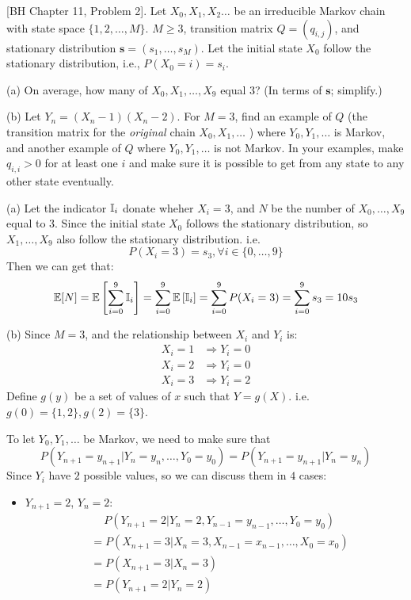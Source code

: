 \begin{homeworkProblem}

[BH Chapter 11, Problem 2]. Let $X_0, X_1, X_2 \ldots$ be an irreducible Markov chain with state space $\{1,2, \ldots, M\}$. $M \geq 3$, transition matrix $Q=\left(q_{i,j}\right)$, and stationary distribution $\mathbf{s}=\left(s_1, \ldots, s_M\right)$. Let the initial state $X_0$ follow the stationary distribution, i.e., $P\left(X_0=i\right)=s_i$.

(a) On average, how many of $X_0, X_1, \ldots, X_9$ equal 3? (In terms of $\mathbf{s}$; simplify.)

(b) Let $Y_n=\left(X_n-1\right)\left(X_n-2\right)$. For $M=3$, find an example of $Q$ (the transition matrix for the \textit{original} chain $X_0, X_1, \ldots$ ) where $Y_0, Y_1, \ldots$ is Markov, and another example of $Q$ where $Y_0, Y_1, \ldots$ is not Markov. In your examples, make $q_{i,i}>0$ for at least one $i$ and make sure it is possible to get from any state to any other state eventually.

\solution

(a) Let the indicator $\mathbb{I}_i$ donate wheher $X_i=3$, and $N$ be the number of $X_0,\ldots,X_9$ equal to 3. Since the initial state $X_0$ follows the stationary distribution, so $X_1,\ldots,X_9$ also follow the stationary distribution. i.e.
$$P(X_i=3)=s_3, \forall i\in\{0,\ldots,9\}$$
Then we can get that:
$$\mathbb{E}[N] = \mathbb{E}\left[\sum_{i=0}^9 \mathbb{I}_i\right] = \sum_{i=0}^9 \mathbb{E}\left[\mathbb{I}_i\right] = \sum_{i=0}^9 P(X_i=3) = \sum_{i=0}^9 s_3 = 10s_3$$

(b) Since $M=3$, and the relationship between $X_i$ and $Y_i$ is:
\begin{align*}
X_i=1 &\Rightarrow Y_i=0 \\
X_i=2 &\Rightarrow Y_i=0 \\
X_i=3 &\Rightarrow Y_i=2
\end{align*}
Define $g(y)$ be a set of values of $x$ such that $Y=g(X)$. i.e. $g(0)=\{1,2\}, g(2)=\{3\}$.

To let $Y_0,Y_1,\ldots$ be Markov, we need to make sure that
$$P(Y_{n+1}=y_{n+1}|Y_n=y_n,\ldots,Y_0=y_0) = P(Y_{n+1}=y_{n+1}|Y_n=y_n)$$
Since $Y_i$ have $2$ possible values, so we can discuss them in $4$ cases:
\begin{itemize}
\item $Y_{n+1}=2$, $Y_n=2$:
\begin{align*}
&\quad\ P(Y_{n+1}=2|Y_n=2,Y_{n-1}=y_{n-1},\ldots,Y_0=y_0) \\
&= P(X_{n+1}=3|X_n=3,X_{n-1}=x_{n-1},\ldots,X_0=x_0) \\
&= P(X_{n+1}=3|X_n=3) \\
&= P(Y_{n+1}=2|Y_n=2)
\end{align*}


\end{itemize}
\end{homeworkProblem}
